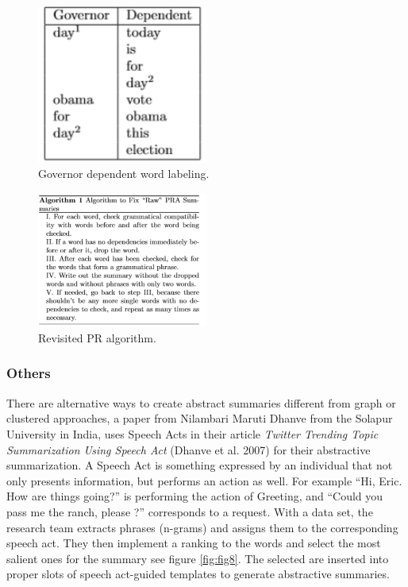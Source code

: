 \documentclass[runningheads]{llncs}
\begin{document}
\begin{figure}[H]
    \centering
    \includegraphics[width=0.5\textwidth]{fig6.png}
    \caption{Governor dependent word labeling.}
    \label{fig:fig6}
\end{figure}

\begin{figure}[H]
    \centering
    \includegraphics[width=0.5\textwidth]{fig7.png}
    \caption{Revisited PR algorithm.}
    \label{fig:fig7}
\end{figure}

\subsubsection{Others}

There are alternative ways to create abstract summaries different from graph or
clustered approaches, a paper from Nilambari Maruti Dhanve from the Solapur
University in India, uses Speech Acts in their article \textit{Twitter Trending
Topic Summarization Using Speech Act} (Dhanve et al.
2007) \cite{dhanve_twitter_2007} for their abstractive summarization.
A Speech Act is something expressed by an individual that not only presents
information, but performs an action as well. For example ``Hi, Eric. How are
things going?'' is performing the action of Greeting, and ``Could you pass me
the ranch, please ?'' corresponds to a request. With a data set, the research
team extracts phrases (n-grams) and assigns them to the corresponding speech
act. They then implement a ranking to the words and select the most salient
ones for the summary see figure \ref{fig:fig8}. The selected are inserted into
proper slots of speech act-guided templates to generate abstractive summaries.
\end{document}
